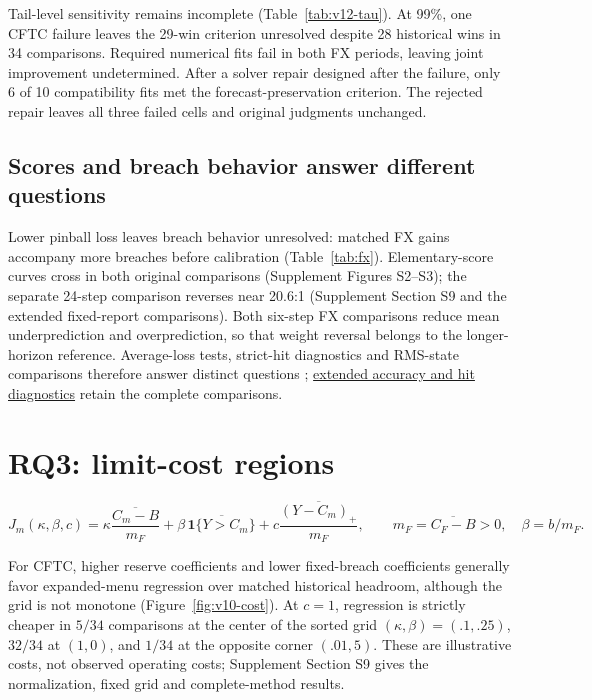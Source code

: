 \documentclass[12pt,a4paper]{article}
\begin{document}
\FloatBarrier

Tail-level sensitivity remains incomplete (Table~\ref{tab:v12-tau}). At 99\%, one CFTC failure leaves the 29-win criterion unresolved despite 28 historical wins in 34 comparisons. Required numerical fits fail in both FX periods, leaving joint improvement undetermined. After a solver repair designed after the failure, only 6 of 10 compatibility fits met the forecast-preservation criterion. The rejected repair leaves all three failed cells and original judgments unchanged.




\subsection{Scores and breach behavior answer different questions}

Lower pinball loss leaves breach behavior unresolved: matched FX gains accompany more breaches before calibration (Table~\ref{tab:fx}). Elementary-score curves cross in both original comparisons (Supplement Figures S2--S3); the separate 24-step comparison reverses near 20.6:1 (Supplement Section S9 and the extended fixed-report comparisons). Both six-step FX comparisons reduce mean underprediction and overprediction, so that weight reversal belongs to the longer-horizon reference. Average-loss tests, strict-hit diagnostics and RMS-state comparisons therefore answer distinct questions \cite{gw2006}; \href{https://github.com/ByronLi0207/financial-mathematics-paper-20261020/blob/submission-final/EXTENDED_RESULTS.md#asmbi-extended-s33}{extended accuracy and hit diagnostics} retain the complete comparisons.

\FloatBarrier

\section{RQ3: limit-cost regions}\label{sec:cost}

\[
J_m(\kappa,\beta,c)=\kappa\frac{\overline{C_m-B}}{m_F}
+\beta\,\overline{\mathbf 1\{Y>C_m\}}
+c\frac{\overline{(Y-C_m)_+}}{m_F},\qquad
m_F=\overline{C_F-B}>0,\quad\beta=b/m_F.
\]

For CFTC, higher reserve coefficients and lower fixed-breach coefficients generally favor expanded-menu regression over matched historical headroom, although the grid is not monotone (Figure~\ref{fig:v10-cost}).
At $c=1$, regression is strictly cheaper in $5/34$ comparisons at the center of the sorted grid $(\kappa,\beta)=(.1,.25)$, $32/34$ at $(1,0)$, and $1/34$ at the opposite corner $(.01,5)$.
These are illustrative costs, not observed operating costs; Supplement Section S9 gives the normalization, fixed grid and complete-method results.
\end{document}
